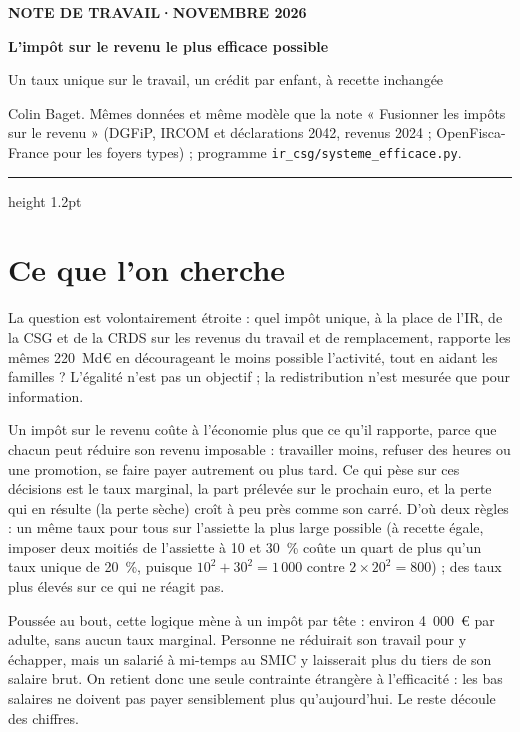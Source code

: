 \documentclass[11pt,a4paper]{article}
\begin{document}
\renewcommand{\figurename}{Figure}\renewcommand{\tablename}{Tableau}

\thispagestyle{empty}
{\footnotesize\color{ocre}\bfseries NOTE DE TRAVAIL\quad·\quad NOVEMBRE 2026\par}
\vspace{6pt}
{\fontsize{20}{24}\selectfont\bfseries\color{bleu}L'impôt sur le revenu le plus efficace possible\par}
\vspace{5pt}
{\large Un taux unique sur le travail, un crédit par enfant, à recette inchangée\par}
\vspace{6pt}
{\small Colin Baget. Mêmes données et même modèle que la note « Fusionner les impôts sur le revenu »
(DGFiP, IRCOM et déclarations 2042, revenus 2024 ; OpenFisca-France pour les foyers types) ; programme
\texttt{ir\_csg/systeme\_efficace.py}.\par}
\vspace{5pt}
{\color{bleu}\hrule height 1.2pt}

\section*{Ce que l'on cherche}

La question est volontairement étroite : quel impôt unique, à la place de l'IR, de la CSG et de la CRDS
sur les revenus du travail et de remplacement, rapporte les mêmes 220~Md€ en décourageant le moins
possible l'activité, tout en aidant les familles ? L'égalité n'est pas un objectif ; la redistribution
n'est mesurée que pour information.

Un impôt sur le revenu coûte à l'économie plus que ce qu'il rapporte, parce que chacun peut réduire son
revenu imposable : travailler moins, refuser des heures ou une promotion, se faire payer autrement ou
plus tard. Ce qui pèse sur ces décisions est le taux marginal, la part prélevée sur le prochain euro, et
la perte qui en résulte (la perte sèche) croît à peu près comme son carré. D'où deux règles : un même
taux pour tous sur l'assiette la plus large possible (à recette égale, imposer deux moitiés de
l'assiette à 10 et 30~\% coûte un quart de plus qu'un taux unique de 20~\%, puisque $10^2+30^2=1\,000$
contre $2\times20^2=800$) ; des taux plus élevés sur ce qui ne réagit pas.

Poussée au bout, cette logique mène à un impôt par tête : environ 4~000~€ par adulte, sans aucun taux
marginal. Personne ne réduirait son travail pour y échapper, mais un salarié à mi-temps au SMIC y
laisserait plus du tiers de son salaire brut. On retient donc une seule contrainte étrangère à
l'efficacité : les bas salaires ne doivent pas payer sensiblement plus qu'aujourd'hui. Le reste découle
des chiffres.
\end{document}
